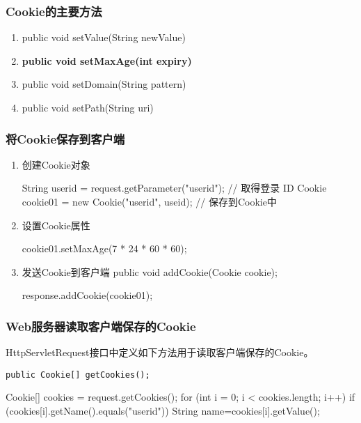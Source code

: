 \begin{frame}[fragile] %
\frametitle{Cookie的主要方法} 
\begin{enumerate}
\item public void setValue(String newValue)
\item {\Blue\bf public void setMaxAge(int expiry)}
\item public void setDomain(String pattern)
\item public void setPath(String uri)
\end{enumerate}
\end{frame}

\begin{frame}[fragile] %
\frametitle{将Cookie保存到客户端}
\begin{enumerate}
\item 创建Cookie对象
\begin{javaCode}
String userid = request.getParameter("userid"); // 取得登录 ID
Cookie cookie01 = new Cookie("userid", useid); // 保存到Cookie中
\end{javaCode}

\item 设置Cookie属性
\begin{javaCode}
cookie01.setMaxAge(7 * 24 * 60 * 60);    
\end{javaCode}

\item 发送Cookie到客户端 public void addCookie(Cookie cookie);
\begin{javaCode}
response.addCookie(cookie01);    
\end{javaCode}
\end{enumerate}
\end{frame}

\begin{frame} %
\frametitle{Web服务器读取客户端保存的Cookie}

HttpServletRequest接口中定义如下方法用于读取客户端保存的Cookie。
\begin{verbatim}
public Cookie[] getCookies();
\end{verbatim}

\begin{javaCode}
Cookie[] cookies = request.getCookies();
for (int i = 0; i < cookies.length; i++) {
  if (cookies[i].getName().equals("userid")) {
    String name=cookies[i].getValue();
  }
}
\end{javaCode}
\end{frame}

